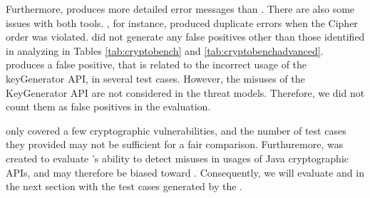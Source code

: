 Furthermore, \cognicryptsast{} produces more detailed error messages than \codyze. There are also some issues with both tools. \codyze{}, for instance, produced duplicate errors when the Cipher order was violated. \codyze{} did not generate any false positives other than those identified in analyzing \cryptoapibench{} in Tables \ref{tab:cryptobench} and \ref{tab:cryptobenchadvanced}. \cognicryptsast{} produces a false positive, that is related to the incorrect usage of the keyGenerator API, in several test cases. However, the misuses of the KeyGenerator API are not considered in the \cryptoapibench{} threat models. Therefore, we did not count them as false positives in the evaluation.

\cryptoapibench{} only covered a few cryptographic vulnerabilities, and the number of test cases they provided may not be sufficient for a fair comparison. Furthuremore, \cryptoapibench{} was created to evaluate \cryptoguard's ability to detect misuses in usages of Java cryptographic APIs, and may therefore be biased toward \cryptoguard. Consequently, we will evaluate \cognicryptsast{} and \codyze{} in the next section with the test cases generated by the \cognicrypttestgen.


